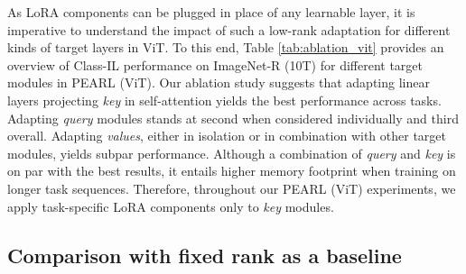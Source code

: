 \documentclass[10pt]{article} %
\begin{document}
As LoRA components can be plugged in place of any learnable layer, it is imperative to understand the impact of such a low-rank adaptation for different kinds of target layers in ViT. To this end, Table \ref{tab:ablation_vit} provides an overview of Class-IL performance on ImageNet-R (10T) for different target modules in PEARL (ViT).  Our ablation study suggests that adapting linear layers projecting \textit{key} in self-attention yields the best performance across tasks. Adapting \textit{query} modules stands at second when considered individually and third overall. Adapting \textit{values}, either in isolation or in combination with other target modules, yields subpar performance. Although a combination of \textit{query} and \textit{key} is on par with the best results, it entails higher memory footprint when training on longer task sequences. Therefore, throughout our PEARL (ViT) experiments, we apply task-specific LoRA components only to \textit{key} modules. 


\begin{table}[ht]
    \centering
    \caption{Class-IL performance comparison of low rank adaptation of different target modules in ViT on ImageNet-R (10T). The best results are highlighted in bold while the second best are underlined.}
    \label{tab:ablation_vit}
\end{table}


\subsection{Comparison with fixed rank as a baseline}
\end{document}
